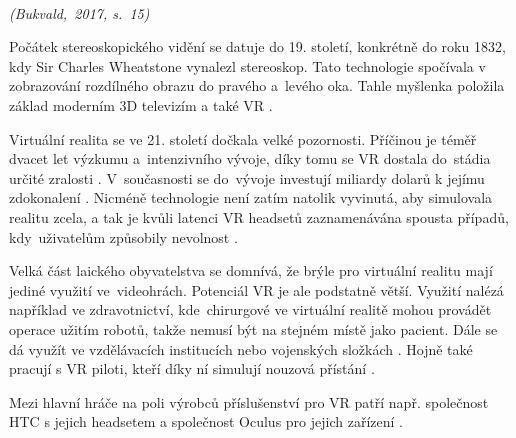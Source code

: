 \documentclass[a4paper,11pt]{article}
\begin{document}
\emph{\\(Bukvald,~2017, s.~15)} \cite{Josef_Bukvald:Studie_o_soucasnem_stavu_virtualni_reality}

Počátek stereoskopického vidění se datuje do 19. století, konkrétně do roku 1832, kdy Sir Charles Wheatstone vynalezl stereoskop. Tato technologie spočívala v zobrazování rozdílného obrazu do pravého a~levého oka. Tahle myšlenka položila základ moderním 3D televizím a také VR \cite{Jason_Jerald:The_VR_Book}.

Virtuální realita se ve 21. století dočkala velké pozornosti. Příčinou je téměř dvacet let výzkumu a~intenzivního vývoje, díky tomu se VR dostala do~stádia určité zralosti \cite{Ronald_Blach:Virtual_Reality_Technology}. V~současnosti se do~vývoje investují miliardy dolarů k jejímu zdokonalení \cite{TIME:Why_Virtual_Reality_Is_About_to_Change_the_World}. Nicméně technologie není zatím natolik vyvinutá, aby simulovala realitu zcela, a tak je kvůli latenci VR headsetů zaznamenávána spousta případů, kdy~uživatelům způsobily nevolnost \cite{BBC:Virtual_Reality_The_Complete_Guy}.

Velká část laického obyvatelstva se domnívá, že brýle pro virtuální realitu mají jediné využití ve~videohrách. Potenciál VR je ale podstatně větší. Využití nalézá například ve zdravotnictví, kde~chirurgové ve virtuální realitě mohou provádět operace užitím robotů, takže nemusí být na stejném místě jako pacient. Dále se dá využít ve vzdělávacích institucích nebo vojenských složkách \cite{Josef_Bukvald:Studie_o_soucasnem_stavu_virtualni_reality}. Hojně také pracují s VR piloti, kteří díky ní simulují nouzová přístání \cite{Michal_Chnoupek:Pocitace_IT}.

Mezi hlavní hráče na poli výrobců příslušenství pro VR patří např. společnost HTC s jejich headsetem  a společnost Oculus pro jejich zařízení  \cite{PC_Magazine:The_many_virtues_of_virtual_reality}.


\newpage

\def\refname{Použitá literatura}

\end{document}

